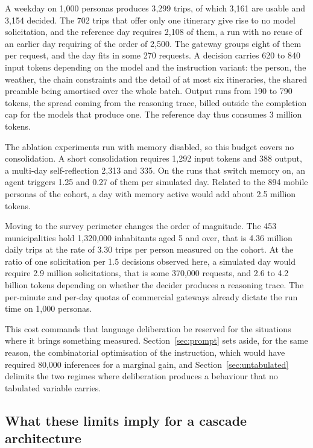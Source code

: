 A weekday on 1{,}000 personas produces 3{,}299 trips, of which 3{,}161 are usable and 3{,}154 decided. The 702 trips that offer only one itinerary give rise to no model solicitation, and the reference day requires 2{,}108 of them, a run with no reuse of an earlier day requiring of the order of 2{,}500. The gateway groups eight of them per request, and the day fits in some 270 requests. A decision carries 620 to 840 input tokens depending on the model and the instruction variant: the person, the weather, the chain constraints and the detail of at most six itineraries, the shared preamble being amortised over the whole batch. Output runs from 190 to 790 tokens, the spread coming from the reasoning trace, billed outside the completion cap for the models that produce one. The reference day thus consumes 3 million tokens.

The ablation experiments run with memory disabled, so this budget covers no consolidation. A short consolidation requires 1{,}292 input tokens and 388 output, a multi-day self-reflection 2{,}313 and 335. On the runs that switch memory on, an agent triggers 1.25 and 0.27 of them per simulated day. Related to the 894 mobile personas of the cohort, a day with memory active would add about 2.5 million tokens.

Moving to the survey perimeter changes the order of magnitude. The 453 municipalities hold 1{,}320{,}000 inhabitants aged 5 and over, that is 4.36 million daily trips at the rate of 3.30 trips per person measured on the cohort. At the ratio of one solicitation per 1.5 decisions observed here, a simulated day would require 2.9 million solicitations, that is some 370{,}000 requests, and 2.6 to 4.2 billion tokens depending on whether the decider produces a reasoning trace. The per-minute and per-day quotas of commercial gateways already dictate the run time on 1{,}000 personas.

This cost commands that language deliberation be reserved for the situations where it brings something measured. Section~\ref{sec:prompt} sets aside, for the same reason, the combinatorial optimisation of the instruction, which would have required 80{,}000 inferences for a marginal gain, and Section~\ref{sec:untabulated} delimits the two regimes where deliberation produces a behaviour that no tabulated variable carries.

\subsection{What these limits imply for a cascade architecture}
\label{sec:cascade}

